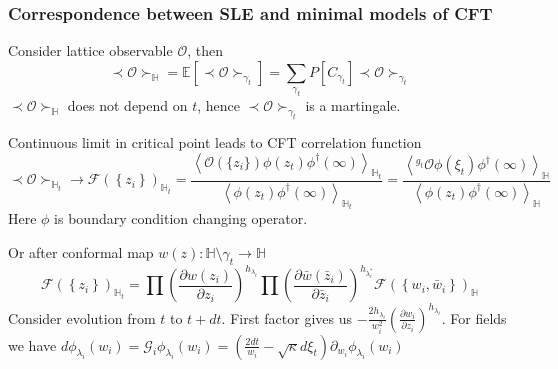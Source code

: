 \documentclass[pdftex]{beamer}
\theoremstyle{definition} \newtheorem{Def}{Definition}
\begin{document}
\begin{frame}
  \frametitle{Correspondence between SLE and minimal models of CFT}
  Consider lattice observable $\mathcal{O}$, then
  \begin{equation*}
    \prec \mathcal{O} \succ_{\mathbb{H}}=\mathbb{E}\left[\prec\mathcal{O}\succ_{\gamma_{t}}\right]=\sum_{\gamma_{t}} P\left[C_{\gamma_{t}}\right] \prec \mathcal{O} \succ_{\gamma_{t}}
  \end{equation*}
  $\prec \mathcal{O} \succ_{\mathbb{H}}$ does not depend on $t$, hence $\prec\mathcal{O}\succ_{\gamma_{t}}$ is a martingale.

  Continuous limit in critical point leads to CFT correlation function
  \begin{equation*}
    \prec \mathcal{O} \succ_{\mathbb{H}_{t}}\to \mathcal{F}(\left\{z_{i}\right\})_{\mathbb{H}_{t}}=
    \frac{\left< \mathcal{O}(\{z_{i}\})\phi(z_{t})\phi^{\dagger}(\infty)\right>_{\mathbb{H}_{t}}}{\left<\phi(z_{t})\phi^{\dagger}(\infty)\right>_{\mathbb{H}_{t}}}=
    \frac{\left< ^{g_{t}}\mathcal{O}\phi(\xi_{t})\phi^{\dagger}(\infty)\right>_{\mathbb{H}}}{\left<\phi(z_{t})\phi^{\dagger}(\infty)\right>_{\mathbb{H}}}
  \end{equation*}
  Here $\phi$ is boundary condition changing operator. 


  Or after conformal map $w(z):\mathbb{H}\setminus\gamma_{t}\to \mathbb{H}$
  \begin{equation*}
    \mathcal{F}(\left\{z_{i}\right\})_{\mathbb{H}_{t}}=\prod \left(\frac{\partial w(z_{i})}{\partial z_{i}}\right)^{h_{\lambda_i}} 
    \prod \left(\frac{\partial \bar w(\bar z_{i})}{\partial \bar z_{i}}\right)^{h_{\lambda^{*}_i}}
        \mathcal{F}(\left\{w_{i}, \bar w_{i}\right\})_{\mathbb{H}}
  \end{equation*}
  Consider evolution from $t$ to $t+dt$. First factor gives us $-\frac{2h_{\lambda_{i}}}{w_{i}^{2}}\left(\frac{\partial w_{i}}{\partial z_{i}}\right)^{h_{\lambda_{i}}}$. For fields we have 
$d\phi_{\lambda_{i}}(w_{i}) = \mathcal{G}_{i}\phi_{\lambda_{i}}(w_{i})=\left(\frac{2dt}{w_{i}}-\sqrt{\kappa} d\xi_{t}\right) \partial_{w_{i}}\phi_{\lambda_{i}}(w_{i})$
\end{frame}
\end{document}
